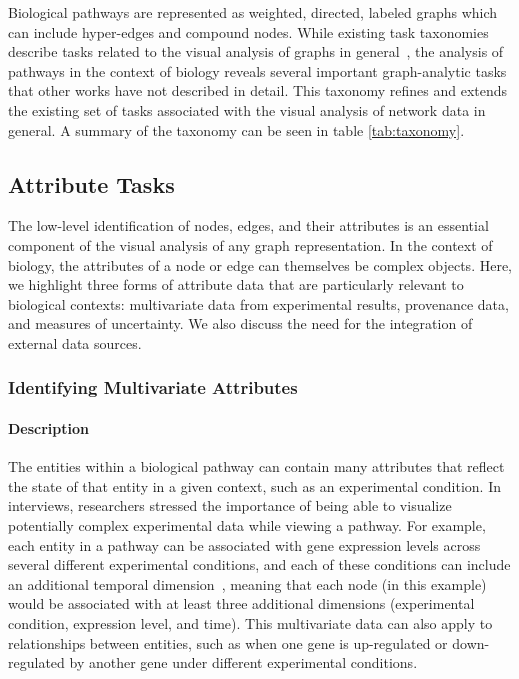 \documentclass[twocolumn]{bmcart}%
\begin{document}
Biological pathways are represented as weighted, directed, labeled graphs which can include hyper-edges and compound nodes.
While existing task taxonomies describe tasks related to the visual analysis of graphs in general~\cite{Ahn2014, Pretorius2014}, the analysis of pathways in the context of biology reveals several important graph-analytic tasks that other works have not described in detail.
This taxonomy refines and extends the existing set of tasks associated with the visual analysis of network data in general.
A summary of the taxonomy can be seen in table \ref{tab:taxonomy}.

\subsection*{Attribute Tasks}

The low-level identification of nodes, edges, and their attributes is an essential component of the visual analysis of any graph representation.
In the context of biology, the attributes of a node or edge can themselves be complex objects.
Here, we highlight three forms of attribute data that are particularly relevant to biological contexts: multivariate data from experimental results, provenance data, and measures of uncertainty.
We also discuss the need for the integration of external data sources.

\subsubsection*{Identifying Multivariate Attributes}

\paragraph*{Description}

The entities within a biological pathway can contain many attributes that reflect the state of that entity in a given context, such as an experimental condition.
In interviews, researchers stressed the importance of being able to visualize potentially complex experimental data while viewing a pathway.
For example, each entity in a pathway can be associated with gene expression levels across several different experimental conditions, and each of these conditions can include an additional temporal dimension~\cite{Barsky2008cerebral}, meaning that each node (in this example) would be associated with at least three additional dimensions (experimental condition, expression level, and time).
This multivariate data can also apply to relationships between entities, such as when one gene is up-regulated or down-regulated by another gene under different experimental conditions.
\end{document}
